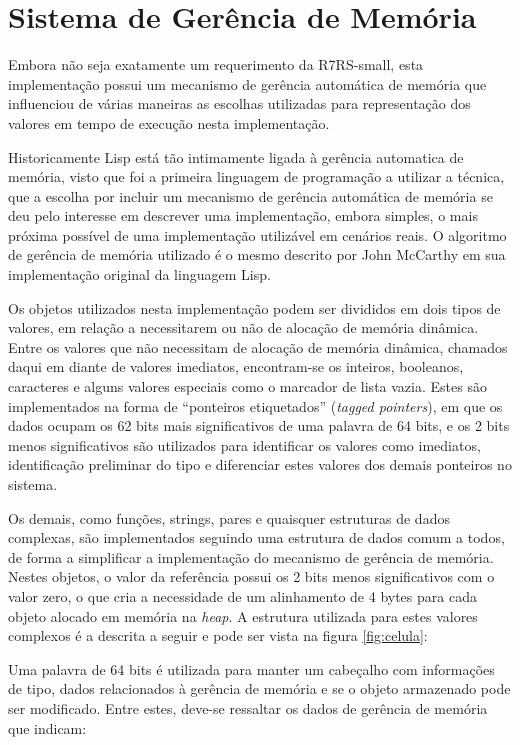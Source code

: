 \section{Sistema de Gerência de Memória}
\label{sec:memoria}

Embora não seja exatamente um requerimento da \acs{R7RS}-small, esta implementação
possui um mecanismo de gerência automática de memória que influenciou de várias
maneiras as escolhas utilizadas para representação dos valores em
tempo de execução nesta implementação.

Historicamente Lisp está tão
intimamente ligada à gerência automatica de memória, visto que foi a primeira
linguagem de programação a utilizar a técnica\cite{mccarthy:lisp}, que a escolha por incluir um
mecanismo de gerência automática de memória se deu pelo interesse em descrever
uma implementação, embora simples, o mais próxima possível de uma implementação
utilizável em cenários reais. O algoritmo de gerência de memória utilizado é 
o mesmo descrito por John McCarthy em sua implementação original da linguagem
Lisp.

Os objetos utilizados nesta implementação podem ser divididos em dois
tipos de valores, em relação a necessitarem ou não de alocação de memória
dinâmica. Entre os valores que não necessitam de alocação de memória dinâmica,
chamados daqui em diante de valores imediatos, encontram-se os inteiros,
booleanos, caracteres e alguns valores especiais como o marcador de lista
vazia. Estes são implementados na forma de ``ponteiros etiquetados''
(\textit{tagged pointers}), em que os dados ocupam os 62 bits mais
significativos de uma palavra de 64 bits, e os 2 bits menos significativos são
utilizados para identificar os valores como imediatos, identificação preliminar
do tipo e diferenciar estes valores dos demais ponteiros no sistema.

Os demais, como funções, strings, pares e quaisquer estruturas de dados
complexas, são implementados seguindo uma estrutura de dados comum a todos, de
forma a simplificar a implementação do mecanismo de gerência de memória.
Nestes objetos, o valor da referência possui os 2 bits menos significativos com
o valor zero, o que cria a necessidade de um alinhamento de 4 bytes para cada
objeto alocado em memória na \textit{heap}. A estrutura utilizada para estes valores complexos é
a descrita a seguir e pode ser vista na figura \ref{fig:celula}:

Uma palavra de 64 bits é utilizada para manter um cabeçalho com informações de
tipo, dados relacionados à gerência de memória e se o objeto armazenado pode
ser modificado. Entre estes, deve-se ressaltar os dados de gerência de memória
que indicam:

